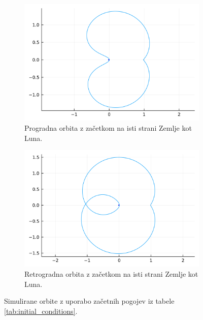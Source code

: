 \documentclass[11pt, titlepage]{article}
\begin{document}
\begin{figure}[h]
    \vspace{0.5cm}

    \begin{subfigure}[b]{0.45\textwidth}
        \centering
        \includegraphics[width=\textwidth]{figures/free_return_orbit_3.png}
        \caption{Progradna orbita z začetkom na isti strani Zemlje kot Luna.}
        \label{fig:orbit_3_sim}
    \end{subfigure}
    \hfill
    \begin{subfigure}[b]{0.45\textwidth}
        \centering
        \includegraphics[width=\textwidth]{figures/free_return_orbit_4.png}
        \caption{Retrogradna orbita z začetkom na isti strani Zemlje kot Luna.}
        \label{fig:orbit_4_sim}
    \end{subfigure}

    \caption{Simulirane orbite z uporabo začetnih pogojev iz tabele \ref{tab:initial_conditions}.}
    \label{fig:orbits}
    
\end{figure}
\end{document}
